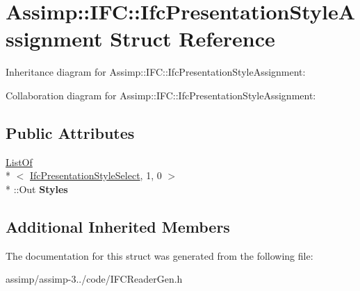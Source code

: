 \hypertarget{struct_assimp_1_1_i_f_c_1_1_ifc_presentation_style_assignment}{\section{Assimp\+:\+:I\+F\+C\+:\+:Ifc\+Presentation\+Style\+Assignment Struct Reference}
\label{struct_assimp_1_1_i_f_c_1_1_ifc_presentation_style_assignment}
}


Inheritance diagram for Assimp\+:\+:I\+F\+C\+:\+:Ifc\+Presentation\+Style\+Assignment\+:


Collaboration diagram for Assimp\+:\+:I\+F\+C\+:\+:Ifc\+Presentation\+Style\+Assignment\+:
\subsection*{Public Attributes}
\begin{DoxyCompactItemize}
\item 
\hypertarget{struct_assimp_1_1_i_f_c_1_1_ifc_presentation_style_assignment_a49a30b2e08274e110ccc5ae446c3f989}{\hyperlink{struct_assimp_1_1_s_t_e_p_1_1_list_of}{List\+Of}\\*
$<$ \hyperlink{class_assimp_1_1_s_t_e_p_1_1_e_x_p_r_e_s_s_1_1_data_type}{Ifc\+Presentation\+Style\+Select}, 1, 0 $>$\\*
\+::Out {\bfseries Styles}}\label{struct_assimp_1_1_i_f_c_1_1_ifc_presentation_style_assignment_a49a30b2e08274e110ccc5ae446c3f989}

\end{DoxyCompactItemize}
\subsection*{Additional Inherited Members}


The documentation for this struct was generated from the following file\+:\begin{DoxyCompactItemize}
\item 
assimp/assimp-\/3../code/I\+F\+C\+Reader\+Gen.\+h\end{DoxyCompactItemize}
